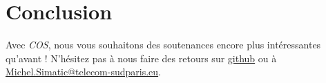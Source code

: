 \documentclass[11pt]{article}
\begin{document}
\section{Conclusion}
\label{sec-8}
Avec \emph{COS}, nous vous souhaitons des soutenances encore plus
intéressantes qu'avant ! N'hésitez pas à nous faire des retours sur
 \href{https://github.com/simatic/COS}{github} ou à \href{mailto:Michel.Simatic@telecom-sudparis.eu}{Michel.Simatic@telecom-sudparis.eu}.
\end{document}
